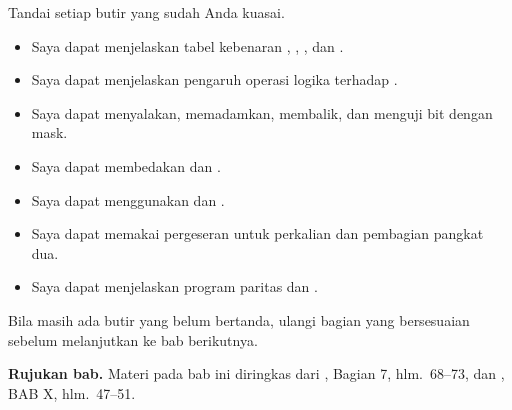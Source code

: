 \begin{checklistbox}
\vspace{1.1em}
Tandai setiap butir yang sudah Anda kuasai.

\begin{itemize}
    \item[\checkbox] Saya dapat menjelaskan tabel kebenaran
          , , , dan .
    \item[\checkbox] Saya dapat menjelaskan pengaruh operasi logika
          terhadap .
    \item[\checkbox] Saya dapat menyalakan, memadamkan, membalik,
          dan menguji bit dengan mask.
    \item[\checkbox] Saya dapat membedakan  dan
          .
    \item[\checkbox] Saya dapat menggunakan  dan
          .
    \item[\checkbox] Saya dapat memakai pergeseran untuk perkalian
          dan pembagian pangkat dua.
    \item[\checkbox] Saya dapat menjelaskan program paritas dan
          .
\end{itemize}

\vspace{0.4em}
Bila masih ada butir yang belum bertanda, ulangi bagian yang
bersesuaian sebelum melanjutkan ke bab berikutnya.
\end{checklistbox}

\begin{infobox}
\vspace{1.1em}
\textbf{Rujukan bab.} Materi pada bab ini diringkas dari
\cite{gunawan2019}, Bagian 7, hlm.~68--73, dan \cite{sto2001},
BAB X, hlm.~47--51.
\end{infobox}
